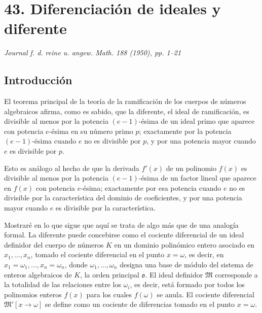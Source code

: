 \documentclass[11pt]{article}
\begin{document}
\clearpage

\section*{43. Diferenciación de ideales y diferente}

\begin{center}
\emph{Journal f. d. reine u. angew. Math. 188 (1950), pp. 1--21}
\end{center}

\subsection*{Introducción}

El teorema principal de la teoría de la ramificación de los cuerpos de números algebraicos afirma, como es sabido, que la diferente, el ideal de ramificación, es divisible al menos por la potencia $(e-1)$-ésima de un ideal primo que aparece con potencia $e$-ésima en su número primo $p$; exactamente por la potencia $(e-1)$-ésima cuando $e$ no es divisible por $p$, y por una potencia mayor cuando $e$ es divisible por $p$.

Esto es análogo al hecho de que la derivada $f'(x)$ de un polinomio $f(x)$ es divisible al menos por la potencia $(e-1)$-ésima de un factor lineal que aparece en $f(x)$ con potencia $e$-ésima; exactamente por esa potencia cuando $e$ no es divisible por la característica del dominio de coeficientes, y por una potencia mayor cuando $e$ es divisible por la característica.

Mostraré en lo que sigue que aquí se trata de algo más que de una analogía formal. La diferente puede concebirse como el cociente diferencial de un ideal definidor del cuerpo de números $K$ en un dominio polinómico entero asociado en $x_1,\ldots,x_n$, tomado el cociente diferencial en el punto $x=\omega$, es decir, en $x_1=\omega_1,\ldots,x_n=\omega_n$, donde $\omega_1,\ldots,\omega_n$ designa una base de módulo del sistema de enteros algebraicos de $K$, la orden principal $\mathfrak o$. El ideal definidor $\mathfrak M$ corresponde a la totalidad de las relaciones entre los $\omega_i$, es decir, está formado por todos los polinomios enteros $f(x)$ para los cuales $f(\omega)$ se anula. El cociente diferencial $\mathfrak M'[x\to\omega]$ se define como un cociente de diferencias tomado en el punto $x=\omega$.
\end{document}
